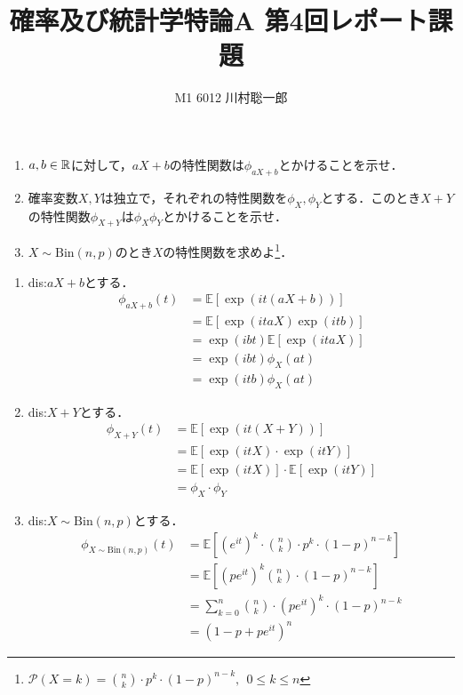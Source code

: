 \documentclass[dvipdfmx]{jsreport}
\title{確率及び統計学特論A 第4回レポート課題}
\author{M1 6012 川村聡一郎}
\date{}
\begin{document}
\maketitle

\begin{tcolorbox}
\begin{enumerate}
	\item $a, b\in \mathbb{R}$に対して，$aX+ b$の特性関数は$\phi_{aX+ b}$とかけることを示せ．
	\item 確率変数$X, Y$は独立で，それぞれの特性関数を$\phi_X, \phi_Y$とする．このとき$X+ Y$の特性関数$\phi_{X+ Y}$は$\phi_X\phi_Y$とかけることを示せ．
	\item $X\sim \mathrm{Bin}(n, p)$のとき$X$の特性関数を求めよ\footnote{$\mathcal{P}(X= k)= \binom{n}{k}\cdot p^k\cdot (1- p)^{n- k},\ \ 0\le k\le n$}．
\end{enumerate}
\end{tcolorbox}

\begin{souanswer} %
\begin{enumerate}
	\item dis:$aX+ b$とする．
\begin{align*}
	\phi_{aX+ b}(t)
	&= \mathbb{E}[\exp(it(aX+ b))]\\
	&= \mathbb{E}[\exp(itaX)\exp(itb)]\\
	&= \exp{(ibt)}\mathbb{E}[\exp(itaX)]\\
	&= \exp{(ibt)}\phi_X(at)\\
	&= \exp{(itb)}\phi_X(at)
\end{align*}

	\item dis:$X+ Y$とする．
\begin{align*}
	\phi_{X+ Y}(t)
	&= \mathbb{E}[\exp{(it(X+ Y))}]\\
	&= \mathbb{E}[\exp{(itX)}\cdot \exp{(itY)}]\\
	&= \mathbb{E}[\exp{(itX)}]\cdot\mathbb{E}[\exp{(itY)}]\\
	&= \phi_{X}\cdot \phi_{Y}
\end{align*}
	\item dis:$X\sim \mathrm{Bin}(n, p)$とする．
\begin{align*}
	\phi_{X\sim\mathrm{Bin}(n,p)}(t)
	&= \mathbb{E}\left[(e^{it})^k\cdot \binom{n}{k}\cdot p^k\cdot (1- p)^{n- k}\right]\\
	&= \mathbb{E}\left[(pe^{it})^k\binom{n}{k}\cdot (1- p)^{n- k}\right]\\
	&= \sum_{k=0}^{n} \binom{n}{k}\cdot (pe^{it})^k\cdot (1- p)^{n- k}\\
	&= (1- p+ pe^{it})^n
\end{align*}
\end{enumerate}
\end{souanswer}
\end{document}
